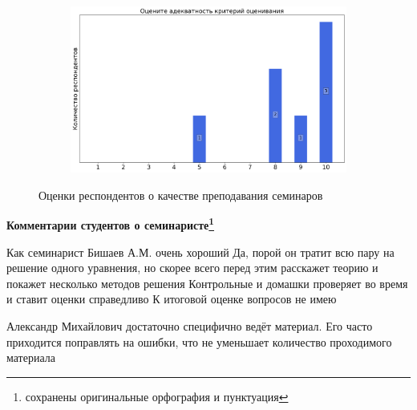 \begin{figure}[H]
\begin{subfigure}[b]{0.45\textwidth}
			\end{subfigure}
			\begin{subfigure}[b]{0.45\textwidth}
				\centering
				\includegraphics[width=\textwidth]{images/2 course/Дифференциальные уравнения/seminarists-marks-Бишаев А.М.-3.png}
			\end{subfigure}	
			\caption{Оценки респондентов о качестве преподавания семинаров}
		\end{figure}

		\textbf{Комментарии студентов о семинаристе\protect\footnote{сохранены оригинальные орфография и пунктуация}}
            \begin{commentbox} 
                Как семинарист Бишаев А.М. очень хороший
                Да, порой он тратит всю пару на решение одного уравнения, но скорее всего перед этим расскажет теорию и покажет несколько методов решения
                Контрольные и домашки проверяет во время и ставит оценки справедливо
                К итоговой оценке вопросов не имею 
            \end{commentbox} 
        
            \begin{commentbox} 
                Александр Михайлович достаточно специфично ведёт материал. Его часто приходится поправлять на ошибки, что не уменьшает количество проходимого материала  
            \end{commentbox}


